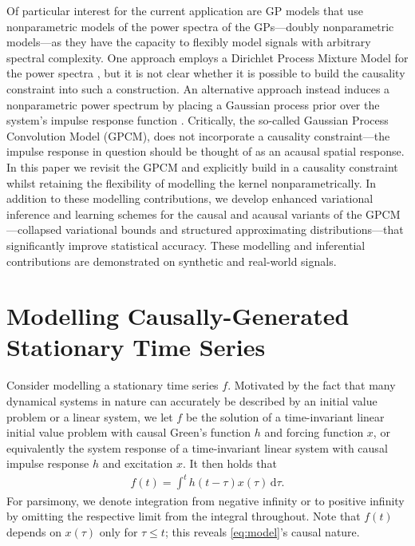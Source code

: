 \documentclass{article}
\newcommand{\id}[1]{\, \mathrm{d} #1}     %
\begin{document}
Of particular interest for the current application are GP models that use nonparametric models of the power spectra of the GPs---doubly nonparametric models---as they have the capacity to flexibly model signals with arbitrary spectral complexity. One approach employs a Dirichlet Process Mixture Model for the power spectra \cite{Oliva:2015:Bayesian_Nonparametric_Kernel-Learning}, but it is not clear whether it is possible to build the causality constraint into such a construction. An alternative approach instead induces a nonparametric power spectrum by placing a Gaussian process prior over the system's impulse response function \cite{Tobar:2015:Learning_Stationary}. Critically, the so-called Gaussian Process Convolution Model (GPCM), does not incorporate a causality constraint---the impulse response in question should be thought of as an acausal spatial response. In this paper we revisit the GPCM and explicitly build in a causality constraint whilst retaining the flexibility of modelling the kernel nonparametrically. In addition to these modelling contributions, we develop enhanced variational inference and learning schemes for the causal and acausal variants of the GPCM---collapsed variational bounds and structured approximating distributions---that significantly improve statistical accuracy. These modelling and inferential contributions are demonstrated on synthetic and real-world signals.

\section{Modelling Causally-Generated Stationary Time Series}
%
Consider modelling a stationary time series $f$. Motivated by the fact that many dynamical systems in nature can accurately be described by an initial value problem or a linear system, we let $f$ be the solution of a time-invariant linear initial value problem with causal Green's function $h$ and forcing function $x$, or equivalently the system response of a time-invariant linear system with causal impulse response $h$ and excitation $x$. It then holds that
\begin{align} \label{eq:model}
    f(t) = \int^t h(t- \tau)x(\tau)\id{\tau}.
\end{align}
For parsimony, we denote integration from negative infinity or to positive infinity by omitting the respective limit from the integral throughout.
Note that $f(t)$ depends on $x(\tau)$ only for $\tau \le t$; this reveals \cref{eq:model}'s causal nature.
\end{document}
